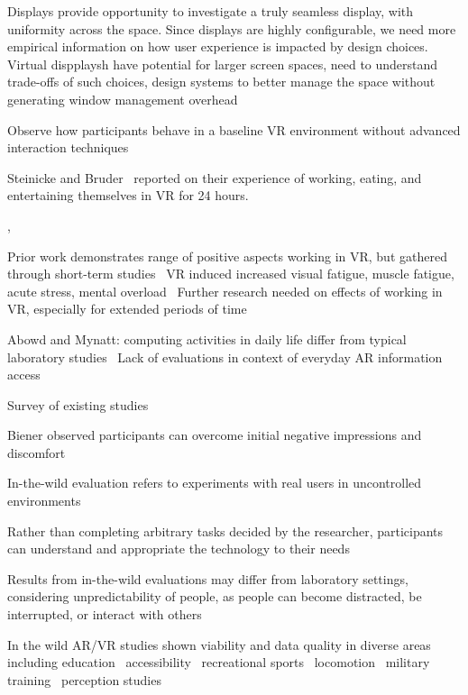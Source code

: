 Displays provide opportunity to investigate a truly seamless display, with uniformity across the space. Since displays are highly configurable, we need more empirical information on how user experience is impacted by design choices. Virtual dispplaysh have potential for larger screen spaces, need to understand trade-offs of such choices, design systems to better manage the space without generating window management overhead~\cite{pavanatto2024multiplemonitors}

Observe how participants behave in a baseline VR environment without advanced interaction techniques


Steinicke and Bruder~\cite{steinicke2014selfexperimentation} reported on their experience of working, eating, and entertaining themselves in VR for 24 hours.



\cite{grubert2010mobileindustrialar}, 


Prior work demonstrates range of positive aspects working in VR, but gathered through short-term studies~\cite{biener2024holdtight}
VR induced increased visual fatigue, muscle fatigue, acute stress, mental overload~\cite{souchet2023vrergonomics}
Further research needed on effects of working in VR, especially for extended periods of time~\cite{biener2024holdtight}


Abowd and Mynatt: computing activities in daily life differ from typical laboratory studies~\cite{abowd2000chartingubicomp} 
Lack of evaluations in context of everyday AR information access~\cite{lu2023inthewild}

Survey of existing studies

Biener observed participants can overcome initial negative impressions and discomfort~\cite{biener2022vrweek}


In-the-wild evaluation refers to experiments with real users in uncontrolled environments \cite{brown2011wild}

Rather than completing arbitrary tasks decided by the researcher, participants can understand and appropriate the technology to their needs~\cite{rogers2011wild} 

Results from in-the-wild evaluations may differ from laboratory settings, considering unpredictability of people, as people can become distracted, be interrupted, or interact with others~\cite{rogers2011wild} 

In the wild AR/VR studies shown viability and data quality in diverse areas including education~\cite{petersen2021pedagogical}
accessibility~\cite{schmelter2023accessible}
recreational sports~\cite{colley2015blended,colley2017ubimount} 
locomotion~\cite{ragozin2020mazerunvr}
military training~\cite{laviola2015military}
perception studies~\cite{arora2021thinkingoutsidelabvr}

